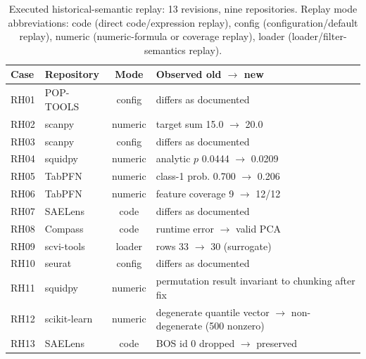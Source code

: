 \documentclass[journal]{IEEEtran}
\begin{document}
\begin{table}[!t]
\centering
\caption{Executed historical-semantic replay: 13 revisions, nine repositories. Replay mode abbreviations: code (direct code/expression replay), config (configuration/default replay), numeric (numeric-formula or coverage replay), loader (loader/filter-semantics replay).}
\label{tab:hist_replay}
\scriptsize
\begin{tabularx}{\columnwidth}{l>{\raggedright\arraybackslash}p{1.7cm}c>{\raggedright\arraybackslash}X}
\toprule
Case & Repository & Mode & Observed old $\to$ new \\
\midrule
RH01 & POP-TOOLS & config & differs as documented \\
RH02 & scanpy & numeric & target sum 15.0 $\to$ 20.0 \\
RH03 & scanpy & config & differs as documented \\
RH04 & squidpy & numeric & analytic $p$ 0.0444 $\to$ 0.0209 \\
RH05 & TabPFN & numeric & class-1 prob. 0.700 $\to$ 0.206 \\
RH06 & TabPFN & numeric & feature coverage 9 $\to$ 12/12 \\
RH07 & SAELens & code & differs as documented \\
RH08 & Compass & code & runtime error $\to$ valid PCA \\
RH09 & scvi-tools & loader & rows 33 $\to$ 30 (surrogate) \\
RH10 & seurat & config & differs as documented \\
RH11 & squidpy & numeric & permutation result invariant to chunking after fix \\
RH12 & scikit-learn & numeric & degenerate quantile vector $\to$ non-degenerate (500 nonzero) \\
RH13 & SAELens & code & BOS id 0 dropped $\to$ preserved \\
\bottomrule
\end{tabularx}
\end{table}
\end{document}
